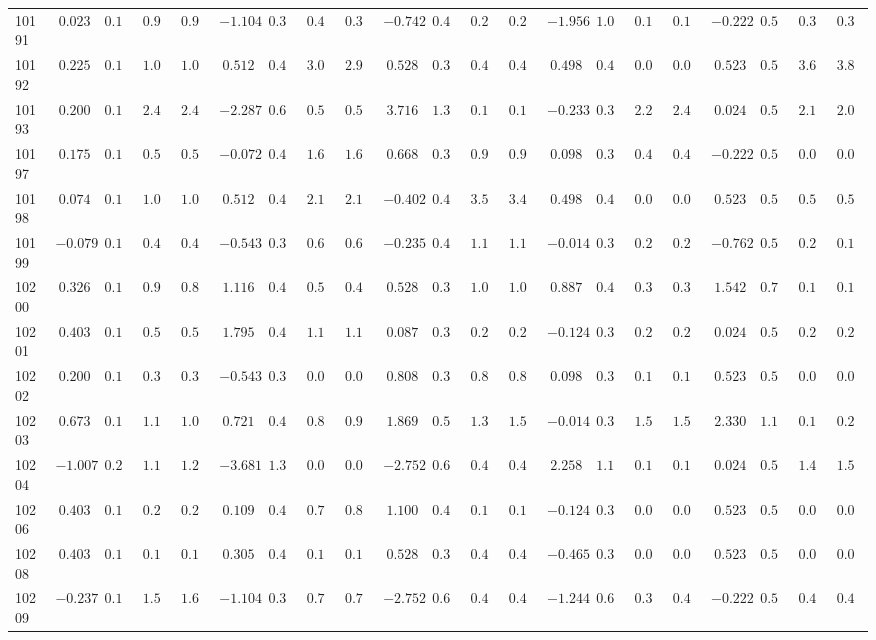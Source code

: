 \begin{landscape}
{\begin{longtable}{l|rrrr|rrrr|rrrr|rrrr|rrrr}
10191&$ 0.023$&$0.160$&$0.952$&$0.964$&$-1.104$&$0.391$&$0.400$&$0.381$&$-0.742$&$0.415$&$0.211$&$0.212$&$-1.956$&$1.082$&$0.145$&$0.149$&$-0.222$&$0.517$&$0.323$&$0.344$\tabularnewline
10192&$ 0.225$&$0.160$&$1.019$&$1.005$&$ 0.512$&$0.443$&$3.013$&$2.969$&$ 0.528$&$0.384$&$0.461$&$0.462$&$ 0.498$&$0.411$&$0.014$&$0.015$&$ 0.523$&$0.538$&$3.664$&$3.845$\tabularnewline
10193&$ 0.200$&$0.160$&$2.406$&$2.445$&$-2.287$&$0.601$&$0.524$&$0.561$&$ 3.716$&$1.382$&$0.102$&$0.107$&$-0.233$&$0.355$&$2.258$&$2.442$&$ 0.024$&$0.513$&$2.149$&$2.043$\tabularnewline
10197&$ 0.175$&$0.160$&$0.583$&$0.584$&$-0.072$&$0.416$&$1.626$&$1.626$&$ 0.668$&$0.384$&$0.926$&$0.923$&$ 0.098$&$0.359$&$0.473$&$0.459$&$-0.222$&$0.517$&$0.021$&$0.023$\tabularnewline
10198&$ 0.074$&$0.160$&$1.088$&$1.079$&$ 0.512$&$0.443$&$2.179$&$2.148$&$-0.402$&$0.408$&$3.557$&$3.492$&$ 0.498$&$0.411$&$0.014$&$0.015$&$ 0.523$&$0.538$&$0.525$&$0.577$\tabularnewline
10199&$-0.079$&$0.161$&$0.411$&$0.400$&$-0.543$&$0.389$&$0.639$&$0.666$&$-0.235$&$0.404$&$1.112$&$1.103$&$-0.014$&$0.353$&$0.212$&$0.207$&$-0.762$&$0.547$&$0.205$&$0.198$\tabularnewline
10200&$ 0.326$&$0.161$&$0.902$&$0.869$&$ 1.116$&$0.430$&$0.521$&$0.497$&$ 0.528$&$0.384$&$1.087$&$1.095$&$ 0.887$&$0.493$&$0.390$&$0.351$&$ 1.542$&$0.765$&$0.184$&$0.130$\tabularnewline
10201&$ 0.403$&$0.162$&$0.561$&$0.568$&$ 1.795$&$0.408$&$1.147$&$1.163$&$ 0.087$&$0.394$&$0.265$&$0.263$&$-0.124$&$0.351$&$0.208$&$0.204$&$ 0.024$&$0.513$&$0.258$&$0.245$\tabularnewline
10202&$ 0.200$&$0.160$&$0.369$&$0.382$&$-0.543$&$0.389$&$0.077$&$0.071$&$ 0.808$&$0.387$&$0.845$&$0.861$&$ 0.098$&$0.359$&$0.153$&$0.164$&$ 0.523$&$0.538$&$0.021$&$0.020$\tabularnewline
10203&$ 0.673$&$0.171$&$1.183$&$1.072$&$ 0.721$&$0.443$&$0.865$&$0.902$&$ 1.869$&$0.531$&$1.313$&$1.584$&$-0.014$&$0.353$&$1.566$&$1.531$&$ 2.330$&$1.198$&$0.174$&$0.222$\tabularnewline
10204&$-1.007$&$0.205$&$1.102$&$1.272$&$-3.681$&$1.306$&$0.087$&$0.095$&$-2.752$&$0.671$&$0.419$&$0.418$&$ 2.258$&$1.137$&$0.144$&$0.139$&$ 0.024$&$0.513$&$1.477$&$1.543$\tabularnewline
10206&$ 0.403$&$0.162$&$0.267$&$0.279$&$ 0.109$&$0.427$&$0.786$&$0.800$&$ 1.100$&$0.404$&$0.115$&$0.116$&$-0.124$&$0.351$&$0.081$&$0.081$&$ 0.523$&$0.538$&$0.021$&$0.020$\tabularnewline
10208&$ 0.403$&$0.162$&$0.126$&$0.130$&$ 0.305$&$0.437$&$0.108$&$0.111$&$ 0.528$&$0.384$&$0.445$&$0.449$&$-0.465$&$0.378$&$0.035$&$0.037$&$ 0.523$&$0.538$&$0.021$&$0.020$\tabularnewline
10209&$-0.237$&$0.165$&$1.597$&$1.644$&$-1.104$&$0.391$&$0.743$&$0.727$&$-2.752$&$0.671$&$0.419$&$0.418$&$-1.244$&$0.630$&$0.397$&$0.401$&$-0.222$&$0.517$&$0.435$&$0.409$\tabularnewline

\end{longtable}}
\end{landscape}

